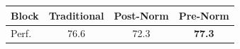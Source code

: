 \begin{tabular}{l|ccc}\toprule
Block &Traditional &Post-Norm &\cellcolor[HTML]{efefef}Pre-Norm \\\midrule
Perf. &76.6 &72.3 &\cellcolor[HTML]{efefef}\textbf{77.3} \\
\bottomrule
\end{tabular}
